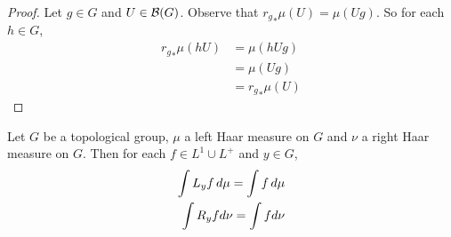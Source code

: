 \documentclass{book}
\begin{document}
	\begin{proof}
		Let $g \in G$ and $U \in \mathcal{B}(G)$. Observe that ${r_{g}}_*\mu(U) = \mu(Ug)$. So for each $h \in G$, 
		\begin{align*}
			{r_{g}}_*\mu(hU) 
			& = \mu(hUg) \\
			& =  \mu(Ug) \\
			& = {r_{g}}_*\mu(U)
		\end{align*}
	\end{proof}
	
	\begin{ex}  
		Let $G$ be a topological group, $\mu$ a left Haar measure on $G$ and $\nu$ a right Haar measure on $G$. Then for each $f \in L^1 \cup L^+$ and $y \in G$, 
		\begin{align}
			\int L_y f \, d \mu = \int f \, d \mu \\
			\int R_y f d\nu = \int f d\nu
		\end{align}
	\end{ex}
	
\end{document}
